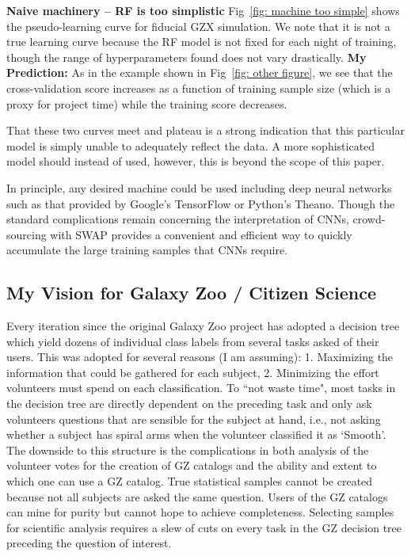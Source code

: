 \documentclass[twocolumn]{aastex6}
\begin{document}
\textbf{Naive machinery -- RF is too simplistic}
Fig~\ref{fig: machine too simple} shows the pseudo-learning curve for fiducial
GZX simulation. We note that it is not a true learning curve because the RF 
model is not fixed for each night of training, though the range of hyperparameters
found does not vary drastically. \textbf{My Prediction:} As in the example shown
in Fig~\ref{fig: other figure}, we see that the cross-validation score increases as a
function of training sample size (which is a proxy for project time) while the training score decreases. 

That these two curves meet and plateau is a strong indication that this particular
model is simply unable to adequately reflect the data. A more sophisticated model 
should instead of used, however, this is beyond the scope of this paper. 

In principle, any desired machine could be used including deep neural networks such 
as that provided by Google's TensorFlow or Python's Theano. Though the standard 
complications remain concerning the interpretation of CNNs, crowd-sourcing with
SWAP provides a convenient and efficient way to quickly accumulate the large training 
samples that CNNs require.  


\subsection{My Vision for Galaxy Zoo / Citizen Science}
Every iteration since the original Galaxy Zoo project has adopted a decision tree
which yield dozens of individual class labels from several tasks asked of their users. 
This was adopted for several reasons (I am assuming): 1. Maximizing the information 
that could be gathered for each subject, 2. Minimizing the effort volunteers must 
spend on each classification. To ``not waste time", most tasks in the decision tree
are directly dependent on the preceding task and only ask volunteers questions that
are sensible for the subject at hand, i.e., not asking whether a subject has spiral arms
when the volunteer classified it as `Smooth'. The downside to this structure is the 
complications in both analysis of the volunteer votes for the creation of GZ catalogs
and the ability and extent to which one can use a GZ catalog. True 
statistical samples cannot be created because not all subjects are asked the same 
question. Users of the GZ catalogs can mine for purity but cannot hope to achieve
completeness. Selecting samples for scientific analysis requires a slew of cuts on 
every task in the GZ decision tree preceding the question of interest. 
\end{document}
